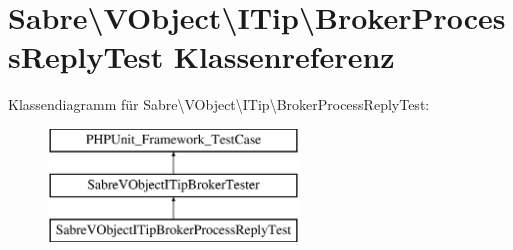 \hypertarget{class_sabre_1_1_v_object_1_1_i_tip_1_1_broker_process_reply_test}{}\section{Sabre\textbackslash{}V\+Object\textbackslash{}I\+Tip\textbackslash{}Broker\+Process\+Reply\+Test Klassenreferenz}
\label{class_sabre_1_1_v_object_1_1_i_tip_1_1_broker_process_reply_test}
Klassendiagramm für Sabre\textbackslash{}V\+Object\textbackslash{}I\+Tip\textbackslash{}Broker\+Process\+Reply\+Test\+:\begin{figure}[H]
\begin{center}
\leavevmode
\includegraphics[height=3.000000cm]{class_sabre_1_1_v_object_1_1_i_tip_1_1_broker_process_reply_test}
\end{center}
\end{figure}
